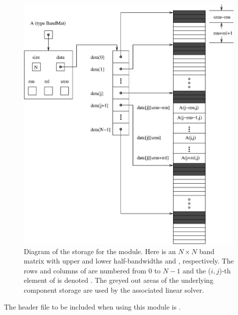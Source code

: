\begin{figure}
\centerline{\includegraphics[width=4.5 in]{bandmat}}
\caption[Diagram of the storage for a banded matrix of type ]
  {Diagram of the storage for the {\sunmatband} module. Here  is an
  $N \times N$ band matrix with upper and lower half-bandwidths 
  and , respectively. The rows and columns of  are
  numbered from $0$ to $N-1$ and the ($i,j$)-th element of  is
  denoted . The greyed out areas of the underlying
  component storage are used by the associated {\sunlinsolband}
  linear solver.}\label{f:bandmat}
\end{figure}

\noindent The header file to be included when using this module 
is . \\

